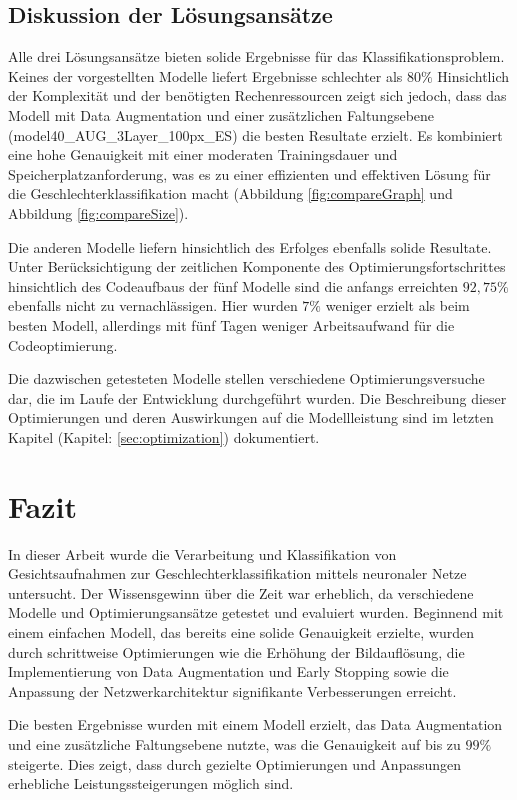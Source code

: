 \documentclass[journal,twoside,web]{ieeecolor}
\begin{document}
\subsection{Diskussion der Lösungsansätze}
Alle drei Lösungsansätze bieten solide Ergebnisse für das Klassifikationsproblem. Keines der vorgestellten Modelle liefert Ergebnisse schlechter als $80\%$ Hinsichtlich der Komplexität und der benötigten Rechenressourcen zeigt sich jedoch, dass das Modell mit Data Augmentation und einer zusätzlichen Faltungsebene (model40\_AUG\_3Layer\_100px\_ES) die besten Resultate erzielt. Es kombiniert eine hohe Genauigkeit mit einer moderaten Trainingsdauer und Speicherplatzanforderung, was es zu einer effizienten und effektiven Lösung für die Geschlechterklassifikation macht (Abbildung \ref{fig:compareGraph} und Abbildung \ref{fig:compareSize}).

Die anderen Modelle liefern hinsichtlich des Erfolges ebenfalls solide Resultate. 
Unter Berücksichtigung der zeitlichen Komponente des Optimierungsfortschrittes hinsichtlich des Codeaufbaus der fünf Modelle sind die anfangs erreichten $92,75\%$ ebenfalls nicht zu vernachlässigen. Hier wurden $7\%$ weniger erzielt als beim besten Modell, allerdings mit fünf Tagen weniger Arbeitsaufwand für die Codeoptimierung. 

Die dazwischen getesteten Modelle stellen verschiedene Optimierungsversuche dar, die im Laufe der Entwicklung durchgeführt wurden. Die Beschreibung dieser Optimierungen und deren Auswirkungen auf die Modellleistung sind im letzten Kapitel (Kapitel: \ref{sec:optimization}) dokumentiert.

\section{Fazit}
\label{sec:conclusion}
In dieser Arbeit wurde die Verarbeitung und Klassifikation von Gesichtsaufnahmen zur Geschlechterklassifikation mittels neuronaler Netze untersucht. Der Wissensgewinn über die Zeit war erheblich, da verschiedene Modelle und Optimierungsansätze getestet und evaluiert wurden. Beginnend mit einem einfachen Modell, das bereits eine solide Genauigkeit erzielte, wurden durch schrittweise Optimierungen wie die Erhöhung der Bildauflösung, die Implementierung von Data Augmentation und Early Stopping sowie die Anpassung der Netzwerkarchitektur signifikante Verbesserungen erreicht.

Die besten Ergebnisse wurden mit einem Modell erzielt, das Data Augmentation und eine zusätzliche Faltungsebene nutzte, was die Genauigkeit auf bis zu $99\%$ steigerte. Dies zeigt, dass durch gezielte Optimierungen und Anpassungen erhebliche Leistungssteigerungen möglich sind.
\end{document}
